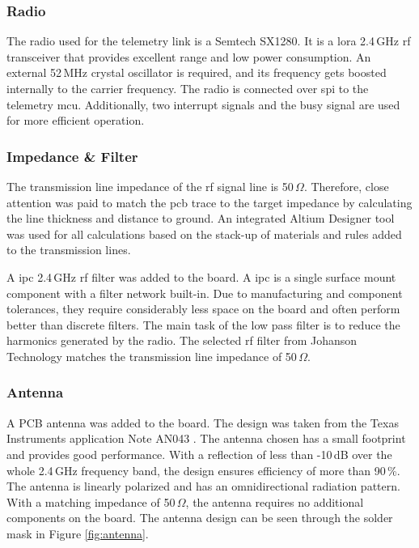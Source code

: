 \subsubsection{Radio}
The radio used for the telemetry link is a Semtech SX1280. It is a \acrshort{lora} 2.4\,GHz \acrshort{rf} transceiver that provides excellent range and low power consumption. An external 52\,MHz crystal oscillator is required, and its frequency gets boosted internally to the carrier frequency. The radio is connected over \acrshort{spi} to the telemetry \acrshort{mcu}. Additionally, two interrupt signals and the busy signal are used for more efficient operation.

\subsubsection{Impedance \& Filter}
The transmission line impedance of the \acrshort{rf} signal line is 50\,$\Omega$. Therefore, close attention was paid to match the \acrshort{pcb} trace to the target impedance by calculating the line thickness and distance to ground. An integrated Altium Designer tool was used for all calculations based on the stack-up of materials and rules added to the transmission lines.  

A \acrshort{ipc} 2.4\,GHz \acrshort{rf} filter was added to the board. A \acrfull{ipc} is a single surface mount component with a filter network built-in. Due to manufacturing and component tolerances, they require considerably less space on the board and often perform better than discrete filters. The main task of the low pass filter is to reduce the harmonics generated by the radio. The selected \acrshort{rf} filter from Johanson Technology matches the transmission line impedance of 50\,$\Omega$.  

\subsubsection{Antenna}
A PCB antenna was added to the board. The design was taken from the Texas Instruments application Note AN043 \cite{ti-antenna}. The antenna chosen has a small footprint and provides good performance. With a reflection of less than -10\,dB over the whole 2.4\,GHz frequency band, the design ensures efficiency of more than 90\,\%. The antenna is linearly polarized and has an omnidirectional radiation pattern. With a matching impedance of 50\,$\Omega$, the antenna requires no additional components on the board. The antenna design can be seen through the solder mask in Figure \ref{fig:antenna}.

